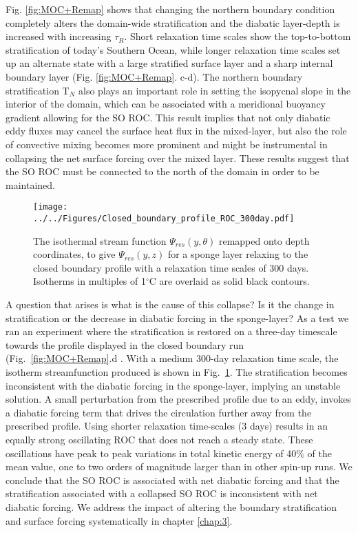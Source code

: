 Fig. \ref{fig:MOC+Remap} shows that changing the northern boundary condition completely alters the domain-wide stratification and the diabatic layer-depth is increased with increasing $\tau _R$. Short relaxation time scales show the top-to-bottom stratification of today's Southern Ocean, while longer relaxation time scales set up an alternate state with a large stratified surface layer and a sharp internal boundary layer (Fig. \ref{fig:MOC+Remap}. c-d). The northern boundary stratification T$_N$ also plays an important role in setting the isopycnal slope in the interior of the domain, which can be associated with a meridional buoyancy gradient allowing for the SO ROC. This result implies that not only diabatic eddy fluxes may cancel the surface heat flux in the mixed-layer, but also the role of convective mixing becomes more prominent and might be instrumental in collapsing the net surface forcing over the mixed layer. These results suggest that the SO ROC must be connected to the north of the domain in order to be maintained.

\begin{figure}
\noindent \texttt{[image: ../../Figures/Closed\_boundary\_profile\_ROC\_300day.pdf]} 
\caption{The isothermal stream function $\Psi_{res}(y,\theta)$ remapped onto depth coordinates, to give $\Psi_{res}(y,z)$ for a sponge layer relaxing to the closed boundary profile with a relaxation time scales of 300 days. Isotherms in multiples of 1$^{\circ}$C are overlaid as solid black contours.}
\label{fig:closedprofile}
\end{figure}

A question that arises is what is the cause of this collapse? Is it the change in stratification or the decrease in diabatic forcing in the sponge-layer? As a test we ran an experiment where the stratification is restored on a three-day timescale towards the profile displayed in the closed boundary run (Fig.~\ref{fig:MOC+Remap}.d . With a medium 300-day relaxation time scale, the isotherm streamfunction produced is shown in Fig.~\ref{fig:closedprofile}. The stratification becomes inconsistent with the diabatic forcing in the sponge-layer, implying an unstable solution. A small perturbation from the prescribed profile due to an eddy, invokes a diabatic forcing term that drives the circulation further away from the prescribed profile. Using shorter relaxation time-scales (3 days) results in an equally strong oscillating ROC that does not reach a steady state. These oscillations have peak to peak variations in total kinetic energy of 40$\%$ of the mean value, one to two orders of magnitude larger than in other spin-up runs.
We conclude that the SO ROC is associated with net diabatic forcing and that the stratification associated with a collapsed SO ROC is inconsistent with net diabatic forcing. We address the impact of altering the boundary stratification and surface forcing systematically in chapter \ref{chap:3}.

